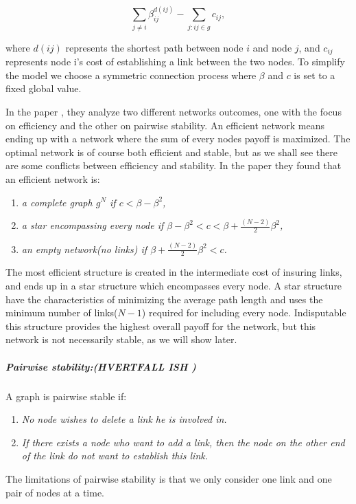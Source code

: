 \begin{equation}
\sum_{j\neq i}^{} \beta_{ij}^{d(ij)} - \sum_{j:ij\in g}^{} {c}_{ij}, 
\label{eq:connecetionGame}
\end{equation}

where $d(ij)$ represents the shortest path between node $i $ and node $j $, and ${c}_{ij}$ represents node i's cost of establishing a link between the two nodes. To simplify the model we choose a symmetric connection process where $\beta$ and $c$ is set to a fixed global value. 

In the paper \cite{jackson1996strategic}, they analyze two different networks outcomes, one with the focus on efficiency and the other on  pairwise stability. An efficient network means ending up with a network where the sum of every nodes payoff is maximized. The optimal network is of course both efficient and stable, but as we shall see there are some conflicts between efficiency and stability. In the paper they found that an efficient network is:
\begin{enumerate}
\item \textit{a complete graph $g^N$ if $c<\beta - \beta^2$,}
\item \textit{a star encompassing every node if $\beta - \beta^2 < c < \beta + \frac{(N-2)}{2}\beta^2$,}
\item \textit{an empty network(no links) if $\beta + \frac{(N-2)}{2}\beta^2 < c$.}
\end{enumerate}

The most efficient structure is created in the intermediate cost of insuring links, and ends up in a star structure which encompasses every node. A star structure have the characteristics of minimizing the average path length and uses the minimum number of links($N-1$) required for including every node. 
Indisputable this structure provides the highest overall payoff for the network, but this network is not necessarily stable, as we will show later.

\subparagraph{Pairwise stability:(HVERTFALL ISH )}
A graph is pairwise stable if:
 \begin{enumerate}
\item \textit{No node wishes to delete a link he is involved in.}
\item \textit{If there exists a node who want to add a link, then the node on the other end of the link do not want to establish this link.}
\end{enumerate} 
The limitations of pairwise stability is that we only consider one link and one pair of nodes at a time.


